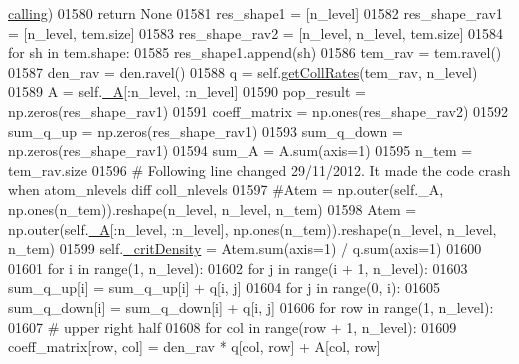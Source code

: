 \begin{DoxyCode}
      \hyperlink{classpyneb_1_1core_1_1pynebcore_1_1_atom_a373b7735acf4f528b54bddf373ad67a1}{calling})
01580                 \textcolor{keywordflow}{return} \textcolor{keywordtype}{None}
01581             res\_shape1 = [n\_level]
01582             res\_shape\_rav1 = [n\_level, tem.size]
01583             res\_shape\_rav2 = [n\_level, n\_level, tem.size]
01584             \textcolor{keywordflow}{for} sh \textcolor{keywordflow}{in} tem.shape:
01585                 res\_shape1.append(sh)
01586             tem\_rav = tem.ravel()
01587             den\_rav = den.ravel()
01588             q = self.\hyperlink{classpyneb_1_1core_1_1pynebcore_1_1_atom_a34711ea989baf7bde752a68255d32098}{getCollRates}(tem\_rav, n\_level)
01589             A = self.\hyperlink{classpyneb_1_1core_1_1pynebcore_1_1_atom_aa6416fe661b8deaa008179314727e025}{\_A}[:n\_level, :n\_level]
01590             pop\_result = np.zeros(res\_shape\_rav1)
01591             coeff\_matrix = np.ones(res\_shape\_rav2)
01592             sum\_q\_up = np.zeros(res\_shape\_rav1)
01593             sum\_q\_down = np.zeros(res\_shape\_rav1)
01594             sum\_A = A.sum(axis=1)
01595             n\_tem = tem\_rav.size
01596             \textcolor{comment}{# Following line changed 29/11/2012. It made the code crash when atom\_nlevels diff coll\_nlevels}
01597             \textcolor{comment}{#Atem = np.outer(self.\_A, np.ones(n\_tem)).reshape(n\_level, n\_level, n\_tem)}
01598             Atem = np.outer(self.\hyperlink{classpyneb_1_1core_1_1pynebcore_1_1_atom_aa6416fe661b8deaa008179314727e025}{\_A}[:n\_level, :n\_level], np.ones(n\_tem)).reshape(n\_level, n\_level, n\_tem)
01599             self.\hyperlink{classpyneb_1_1core_1_1pynebcore_1_1_atom_a1d0823a36ca030fd149522fe72908631}{\_critDensity} = Atem.sum(axis=1) / q.sum(axis=1)
01600 
01601             \textcolor{keywordflow}{for} i \textcolor{keywordflow}{in} range(1, n\_level):
01602                 \textcolor{keywordflow}{for} j \textcolor{keywordflow}{in} range(i + 1, n\_level):
01603                     sum\_q\_up[i] = sum\_q\_up[i] + q[i, j]
01604                 \textcolor{keywordflow}{for} j \textcolor{keywordflow}{in} range(0, i):
01605                     sum\_q\_down[i] = sum\_q\_down[i] + q[i, j]
01606             \textcolor{keywordflow}{for} row \textcolor{keywordflow}{in} range(1, n\_level):
01607                 \textcolor{comment}{# upper right half            }
01608                 \textcolor{keywordflow}{for} col \textcolor{keywordflow}{in} range(row + 1, n\_level):
01609                     coeff\_matrix[row, col] = den\_rav * q[col, row] + A[col, row]

\end{DoxyCode}

